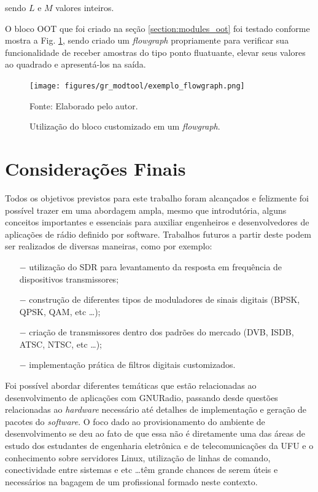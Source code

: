 \documentclass[
  12pt,				%
  openright,			%
  twoside,			%
  a4paper,			%
  english,			%
  french,				%
  spanish,			%
  brazil,				%
  ]{abntex2}
\begin{document}
sendo $L$ e $M$ valores inteiros.

O bloco OOT que foi criado na seção \ref{section:modules_oot} foi testado conforme mostra a Fig. \ref{fig:exemplo_flowgraph}, sendo criado um \textit{flowgraph} propriamente para verificar
sua funcionalidade de receber amostras do tipo ponto fluatuante, elevar seus valores ao quadrado e apresentá-los na saída.

\begin{figure}[!htb]
  \centering
  \caption{Utilização do bloco customizado em um \textit{flowgraph}.}
  \texttt{[image: figures/gr\_modtool/exemplo\_flowgraph.png]}

  Fonte: Elaborado pelo autor.
  \label{fig:exemplo_flowgraph}
\end{figure}





\chapter{Considerações Finais}

Todos os objetivos previstos para este trabalho foram alcançados e felizmente foi possível trazer em uma abordagem ampla, mesmo que introdutória, alguns conceitos importantes e essenciais
para auxiliar engenheiros e desenvolvedores de aplicações de rádio definido por software. Trabalhos futuros a partir deste podem ser realizados de diversas maneiras, como por exemplo:

\begin{itemize}
  \item[$-$] utilização do SDR para levantamento da resposta em frequência de dispositivos transmissores;
  \item[$-$] construção de diferentes tipos de moduladores de sinais digitais (BPSK, QPSK, QAM, etc \ldots);
  \item[$-$] criação de transmissores dentro dos padrões do mercado (DVB, ISDB, ATSC, NTSC, etc \ldots);
  \item[$-$] implementação prática de filtros digitais customizados.
\end{itemize}

Foi possível abordar diferentes temáticas que estão relacionadas ao desenvolvimento de aplicações com GNURadio, passando desde questões relacionadas ao \textit{hardware} necessário até detalhes
de implementação e geração de pacotes do \textit{software}. O foco dado ao provisionamento do ambiente de desenvolvimento se deu ao fato de que essa não é diretamente uma das áreas de estudo dos
estudantes de engenharia eletrônica e de telecomunicações da UFU e o conhecimento sobre servidores Linux, utilização de linhas de comando, conectividade entre sistemas e etc \ldots têm grande chances
de serem úteis e necessários na bagagem de um profissional formado neste contexto.
\end{document}
